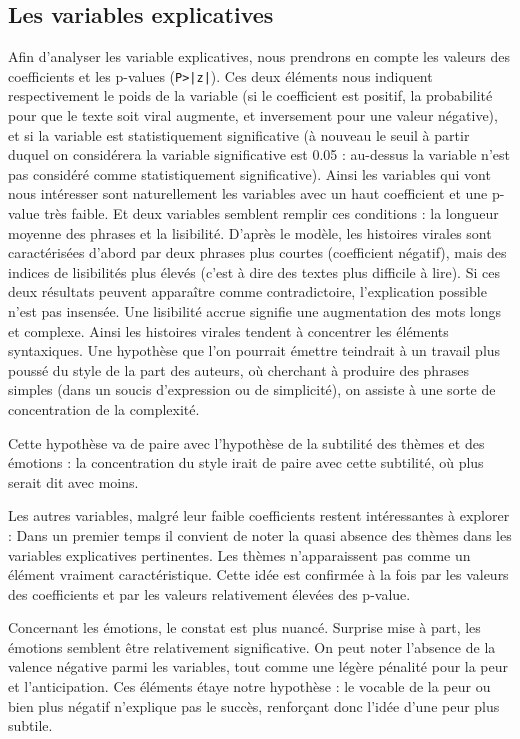 \documentclass[12pt,a4paper,oneside,titlepage]{book} %
\begin{document}
\subsection{Les variables explicatives}
Afin d'analyser les variable explicatives, nous prendrons en compte les valeurs des coefficients et les p-values (\texttt{P>|z|}). Ces deux éléments nous indiquent respectivement le poids de la variable (si le coefficient est positif, la probabilité pour que le texte soit viral augmente, et inversement pour une valeur négative), et si la variable est statistiquement significative (à nouveau le seuil à partir duquel on considérera la variable significative est 0.05 : au-dessus la variable n'est pas considéré comme statistiquement significative).  Ainsi les variables qui vont nous intéresser sont naturellement les variables avec un haut coefficient et une p-value très faible. 
Et deux variables semblent remplir ces conditions : la longueur moyenne des phrases et la lisibilité. D'après le modèle, les histoires virales sont caractérisées d'abord par deux phrases plus courtes (coefficient négatif), mais des indices de lisibilités plus élevés (c'est à dire des textes plus difficile à lire). 
Si ces deux résultats peuvent apparaître comme contradictoire, l'explication possible n'est pas insensée. Une lisibilité accrue signifie une augmentation des mots longs et complexe. Ainsi les histoires virales tendent à concentrer les éléments syntaxiques. Une hypothèse que l'on pourrait émettre teindrait à un travail plus poussé du style de la part des auteurs, où cherchant à produire des phrases simples (dans un soucis d'expression ou de simplicité), on assiste à une sorte  de concentration de la complexité. 

Cette hypothèse va de paire avec l'hypothèse de la subtilité des thèmes et des émotions : la concentration du style irait de paire avec cette subtilité, où plus serait dit avec moins.

Les autres variables, malgré leur faible coefficients restent intéressantes à explorer : Dans un premier temps il convient de noter la quasi absence des thèmes dans les variables explicatives pertinentes. Les thèmes n'apparaissent pas comme un élément vraiment caractéristique. Cette idée est confirmée à la fois par les valeurs des coefficients et par les valeurs relativement élevées des p-value.

Concernant les émotions, le constat est plus nuancé. Surprise mise à part, les émotions semblent être relativement significative. On peut noter l'absence de la valence négative parmi les variables, tout comme une légère pénalité pour la peur et l'anticipation. Ces éléments étaye notre hypothèse : le vocable de la peur ou bien plus négatif n'explique pas le succès, renforçant donc l'idée d'une peur plus subtile.
\end{document}
